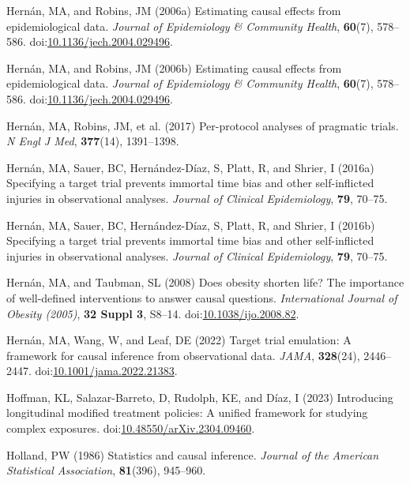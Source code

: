 \documentclass[
  single column]{article}
\newlength{\cslhangindent}
\newenvironment{CSLReferences}[2] %
 {\begin{list}{}{%
  \setlength{\itemindent}{0pt}
  \setlength{\leftmargin}{0pt}
  \setlength{\parsep}{0pt}
  \ifodd #1
   \setlength{\leftmargin}{\cslhangindent}
   \setlength{\itemindent}{-1\cslhangindent}
  \fi
  \setlength{\itemsep}{#2\baselineskip}}}
 {\end{list}}
\begin{document}
\begin{CSLReferences}{1}{0}
Hernán, MA, and Robins, JM (2006a) Estimating causal effects from
epidemiological data. \emph{Journal of Epidemiology \& Community
Health}, \textbf{60}(7), 578--586.
doi:\href{https://doi.org/10.1136/jech.2004.029496}{10.1136/jech.2004.029496}.

Hernán, MA, and Robins, JM (2006b) Estimating causal effects from
epidemiological data. \emph{Journal of Epidemiology \& Community
Health}, \textbf{60}(7), 578--586.
doi:\href{https://doi.org/10.1136/jech.2004.029496}{10.1136/jech.2004.029496}.

Hernán, MA, Robins, JM, et al. (2017) Per-protocol analyses of pragmatic
trials. \emph{N Engl J Med}, \textbf{377}(14), 1391--1398.

Hernán, MA, Sauer, BC, Hernández-Díaz, S, Platt, R, and Shrier, I
(2016a) Specifying a target trial prevents immortal time bias and other
self-inflicted injuries in observational analyses. \emph{Journal of
Clinical Epidemiology}, \textbf{79}, 70--75.

Hernán, MA, Sauer, BC, Hernández-Díaz, S, Platt, R, and Shrier, I
(2016b) Specifying a target trial prevents immortal time bias and other
self-inflicted injuries in observational analyses. \emph{Journal of
Clinical Epidemiology}, \textbf{79}, 70--75.

Hernán, MA, and Taubman, SL (2008) Does obesity shorten life? The
importance of well-defined interventions to answer causal questions.
\emph{International Journal of Obesity (2005)}, \textbf{32 Suppl 3},
S8--14.
doi:\href{https://doi.org/10.1038/ijo.2008.82}{10.1038/ijo.2008.82}.

Hernán, MA, Wang, W, and Leaf, DE (2022) Target trial emulation: A
framework for causal inference from observational data. \emph{JAMA},
\textbf{328}(24), 2446--2447.
doi:\href{https://doi.org/10.1001/jama.2022.21383}{10.1001/jama.2022.21383}.

Hoffman, KL, Salazar-Barreto, D, Rudolph, KE, and Díaz, I (2023)
Introducing longitudinal modified treatment policies: A unified
framework for studying complex exposures.
doi:\href{https://doi.org/10.48550/arXiv.2304.09460}{10.48550/arXiv.2304.09460}.

Holland, PW (1986) Statistics and causal inference. \emph{Journal of the
American Statistical Association}, \textbf{81}(396), 945--960.


\end{CSLReferences}
\end{document}
